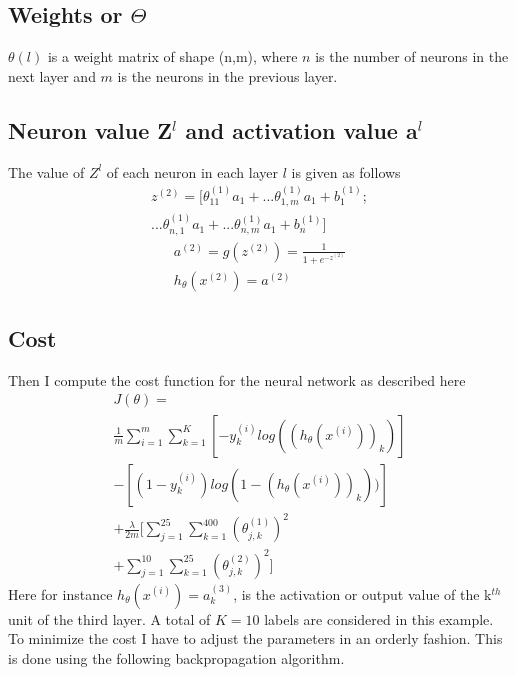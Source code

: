 \documentclass[twocolumn]{article}
\begin{document}
\subsection{Weights or $\Theta$}
$\theta(l)$ is a weight matrix of shape (n,m), where $n$ is the number of neurons in the next layer and $m$ is the neurons in the previous layer.
\subsection{Neuron value Z$^l$ and activation value a$^l$}
The value of $Z^l$ of each neuron in each layer $l$ is given as follows
\begin{align*}
	z^{(2)} = [\theta_{11}^{(1)}a_1 + . . .\theta_{1,m}^{(1)}a_1 + b_1^{(1)} ;\\... \theta_{n,1}^{(1)}a_1 + . . .\theta_{n,m}^{(1)}a_1 + b_n^{(1)}]
\end{align*}
\begin{align*}
	a^{(2)} = g(z^{(2)}) = \frac{1}{1 + e^{-z^{(2)}}}\\
	h_{\theta}(x^{(2)}) = a^{(2)}
\end{align*}
\subsection{Cost}
Then I compute the cost function for the neural network as described here
\begin{align*}
	J(\theta) =\\ \frac{1}{m}\sum_{i=1}^m\sum_{k=1}^K [-y_k^{(i)} log((h_{\theta}(x^{(i)}))_k)]\\ - [(1-y_k^{(i)}) log(1-(h_{\theta}(x^{(i)}))_k))]\\ + \frac{\lambda}{2m}[\sum_{j=1}^{25}\sum_{k=1}^{400}(\theta_{j,k}^{(1)})^2 \\ + \sum_{j=1}^{10}\sum_{k=1}^{25}(\theta_{j,k}^{(2)})^2]
\end{align*}
Here for instance $h_{\theta}(x^{(i)}) = a_k^{(3)}$, is the activation or output value of the k$^{th}$  unit of the third layer. A total of $K = 10$ labels are considered in this example. To minimize the cost I have to adjust the parameters in an orderly fashion. This is done using the following backpropagation algorithm.
\end{document}
